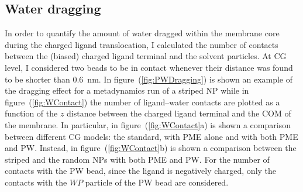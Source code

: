 \subsection{Water dragging}
\label{sec:WDragging}
In order to quantify the amount of water dragged within the membrane core during the charged ligand translocation, I calculated the number of contacts between the (biased) charged ligand terminal and the solvent particles. At \ac{CG} level, I considered two beads to be in contact whenever their distance was found to be shorter than $0.6$~nm. In figure~(\ref{fig:PWDragging}) is shown an example of the dragging effect for a metadynamics run of a striped \ac{NP} while in figure~(\ref{fig:WContact}) the number of ligand--water contacts are plotted as a function of the $z$ distance between the charged ligand terminal and the \ac{COM} of the membrane. In particular, in figure~(\ref{fig:WContact}a) is shown a comparison between different \ac{CG} \martini models: the standard, with \ac{PME} alone and with both \ac{PME} and \ac{PW}. Instead, in figure~(\ref{fig:WContact}b) is shown a comparison between the striped and the random \acp{NP} with both \ac{PME} and \ac{PW}. For the number of contacts with the \ac{PW} bead, since the ligand is negatively charged, only the contacts with the $WP$ particle of the \ac{PW} bead are considered.
